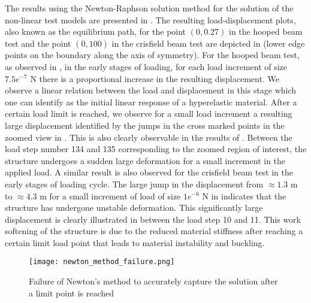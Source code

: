 The results using the Newton-Raphson solution method for the solution of the non-linear test models are presented in . The resulting load-displacement plots, also known as the equilibrium path, for the point $(0, 0.27)$ in the hooped beam test and the point $(0, 100)$ in the crisfield beam test are depicted in  (lower edge points on the boundary along the axis of symmetry). For the hooped beam test, as observed in , in the early stages of loading, for each load increment of size $7.5e^{-7}$ N there is a proportional increase in the resulting displacement. We observe a linear relation between the load and displacement in this stage which one can identify as the initial linear response of a hyperelastic material. After a certain load limit is reached, we observe for a small load increment a resulting large displacement identified by the jumps in the cross marked points in the zoomed view in . This is also clearly observable in the results of . Between the load step number 134 and 135 corresponding to the zoomed region of interest, the structure undergoes a sudden large deformation for a small increment in the applied load. A similar result is also observed for the crisfield beam test in the early stages of loading cycle. The large jump in the displacement from $\approx 1.3$ m to $\approx 4.3$ m for a small increment of load of size $1e^{-6}$ N in  indicates that the structure has undergone unstable deformation. This significantly large displacement is clearly illustrated in  between the load step 10 and 11. This work softening of the structure is due to the reduced material stiffness after reaching a certain limit load point that leads to material instability and buckling. \par 

\begin{figure}[h!]
\centering
\texttt{[image: newton\_method\_failure.png]}
\caption{Failure of Newton's method to accurately capture the solution after a limit point is reached \cite{Vasios}}
\label{fig:2.17}
\end{figure}


